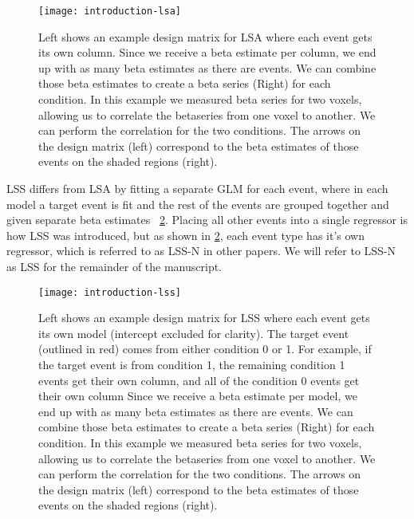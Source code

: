 \documentclass[10pt,letterpaper]{article}
\begin{document}
\begin{figure}[H]
  \centering
  \texttt{[image: introduction-lsa]}
  \caption{
    Left shows an example design matrix for LSA where each event gets its own column.
    Since we receive a beta estimate per column, we end up with as many beta estimates as there
    are events.
    We can combine those beta estimates to create a beta series (Right) for each condition.
    In this example we measured beta series for two voxels, allowing us to
    correlate the betaseries from one voxel to another.
    We can perform the correlation for the two conditions.
    The arrows on the design matrix (left) correspond to the beta estimates of those events
    on the shaded regions (right).
  }
  \label{fig:introlsa}
\end{figure}

LSS differs from LSA by fitting a separate GLM for each event, where in each model a target
event is fit and the rest of the events are grouped together and given separate beta estimates ~\ref{fig:introlss}.
Placing all other events into a single regressor is how LSS was introduced, but as shown in \ref{fig:introlss},
each event type has it's own regressor, which is referred to as LSS-N in other papers.
We will refer to LSS-N as LSS for the remainder of the manuscript.

\begin{figure}[H]
  \centering
  \texttt{[image: introduction-lss]}
  \caption{
    Left shows an example design matrix for LSS where each event gets its own model
    (intercept excluded for clarity).
    The target event (outlined in red) comes from either condition 0 or 1.
    For example, if the target event is from condition 1, the remaining condition 1 events
    get their own column, and all of the condition 0 events get their own column
    Since we receive a beta estimate per model, we end up with as many beta estimates as there
    are events.
    We can combine those beta estimates to create a beta series (Right) for each condition.
    In this example we measured beta series for two voxels, allowing us to
    correlate the betaseries from one voxel to another.
    We can perform the correlation for the two conditions.
    The arrows on the design matrix (left) correspond to the beta estimates of those events
    on the shaded regions (right).
  }
  \label{fig:introlss}
\end{figure}
\end{document}
